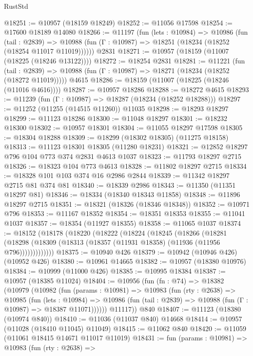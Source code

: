\begin{lexlean}{RustStd}
\begin{coremodule}
{\begin{coremodule}
{{{{{{{{{{{{{{{{{{{{{{{{{{{{{{{{{@18251 := @10957 (@18159 @18249)
@18252 := @11056 @17598
@18254 := @17600 @18189 @14080
@18266 := @11197
    (fun (lets : @10984) =>
    @10986
      (fun (tail : @2839) =>
      @10988 (fun (Γ : @10987) => @18251 (@18234 (@18252 (@18254 @11017 @11019))))))
    @2831
@18271 := @10957 (@18159 (@11007 (@18225 (@18246 @13122))))
@18272 := @18254 @2831
@18281 := @11221
    (fun (tail : @2839) => @10988 (fun (Γ : @10987) => @18271 (@18234 (@18252 (@18272 @11019)))))
    @4615
@18286 := @18159 (@11007 (@18225 (@18246 (@11016 @4616))))
@18287 := @10957 @18286
@18288 := @18272 @4615
@18293 := @11239 (fun (Γ : @10987) => @18287 (@18234 (@18252 @18288)))
@18297 := @11252 (@11255 (@14515 @11260)) @11035
@18298 := @18293 @18297
@18299 := @11123 @18286
@18300 := @11048 @18297
@18301 := @18232 @18300
@18302 := @10957 @18301
@18304 := @11055 @18297 @17598
@18305 := @18304 @18288
@18309 := @18299 (@18302 @18305) (@11275 @18158)
@18313 := @11123 @18301 @18305 (@11280 @18231)
@18321 := @12852 @18297 @796 @104 @773 @374 @2831 @4613 @1037
@18323 := @11793 @18297 @2715
@18326 := @18323 @104 @773 @4613
@18328 := @11802 @18297 @2715
@18334 := @18328 @101 @103 @374 @16 @2986 @2844
@18339 := @11342 @18297 @2715 @81 @374 @81
@18340 := @18339 @2986
@18343 := @11350 (@11351 @18297 @81)
@18346 := @18334 (@18340 @18343 @11858)
@18348 := @11896 @18297 @2715
@18351 := @18321 (@18326 (@18346 @18348))
@18352 := @10971 @796
@18353 := @11167 @18352
@18354 := @18351 @18353
@18355 := @11041 @1037
@18357 := @18354 (@11927 @18355)
@18358 := @11065 @1037
@18374 := @18152
    (@18178
      (@18220
        (@18222
          (@18224
            (@18245
              (@18266
                (@18281
                  (@18298 (@18309 (@18313 (@18357 (@11931 @18358) (@11936 (@11956 @796)))))))))))))
@18375 := @10940 @426
@18379 := @10942 (@10946 @426) (@10952 @426)
@18380 := @10961 @14665
@18382 := @10957 (@18380 @10976)
@18384 := @10999 (@11000 @426)
@18385 := @10995 @18384
@18387 := @10957 (@18385 @11024)
@18404 := @10956
    (fun (fn : @74) =>
    @18382
      (@10979
        (@10982
          (fun (params : @10981) =>
          @10983
            (fun (rty : @2638) =>
            @10985
              (fun (lets : @10984) =>
              @10986 (fun (tail : @2839) => @10988 (fun (Γ : @10987) => @18387 @11071))))))
        @11117))
    @840
@18407 := @11123 (@18380 (@10974 @840))
@18410 := @11036 (@11037 @840) @14668
@18414 := @10957 (@11028 (@18410 @11045) @11049)
@18415 := @11062 @840
@18420 := @11059 (@11061 @18415 @14671 @11017 @11019)
@18431 := fun (params : @10981) =>
  @10983
    (fun (rty : @2638) =>
}}}}}}}}}}}}}}}}}}}}}}}}}}}}}}}}}
\end{coremodule}}
\end{coremodule}
\end{lexlean}

